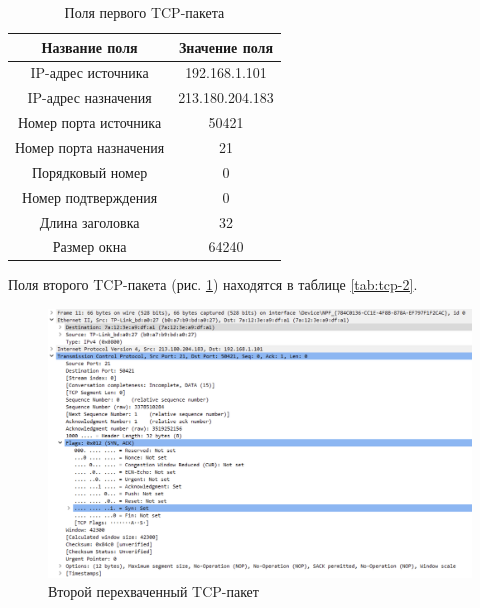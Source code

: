\documentclass[a4paper, 14pt]{extarticle}
\begin{document}
\begin{table}[H]
  \caption{Поля первого TCP-пакета}
  \label{tab:tcp-1}

  \centering
  \renewcommand*{\arraystretch}{1.2}
  \setlength{\tabcolsep}{12pt}

  \begin{tabular}{|c|c|}
    \hline
    \textbf{Название поля} & \textbf{Значение поля} \\
    \hline
    IP-адрес источника & 192.168.1.101 \\
    \hline
    IP-адрес назначения & 213.180.204.183 \\
    \hline
    Номер порта источника & 50421 \\
    \hline
    Номер порта назначения & 21 \\
    \hline
    Порядковый номер & 0 \\
    \hline
    Номер подтверждения & 0 \\
    \hline
    Длина заголовка & 32 \\
    \hline
    Размер окна & 64240 \\
    \hline
  \end{tabular}
\end{table}

Поля второго TCP-пакета (рис. \ref{fig:tcp-2}) находятся в таблице
\ref{tab:tcp-2}.

\begin{figure}[H]
  \centering
  \includegraphics[width=\textwidth]{images/tcp-2.png}
  \caption{Второй перехваченный TCP-пакет}
  \label{fig:tcp-2}
\end{figure}
\end{document}
